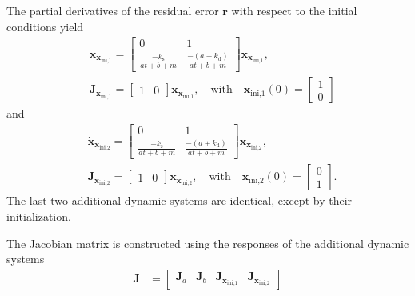 The partial derivatives of the residual error $\mathbf{r}$ with respect to the initial conditions yield 
\begin{equation} \begin{aligned}
    & \dot{\mathbf{x}}_{\mathbf{x}_{\text{ini,1}}} = \begin{bmatrix} 0 & 1 \\ \frac{-k_{\mathrm{s}}}{a t + b + m} & \frac{-(a + k_{\mathrm{d}})}{a t + b + m} \end{bmatrix} \mathbf{x}_{\mathbf{x}_{\text{ini,1}}}  , \\
    & \mathbf{J}_{\mathbf{x}_{\text{ini,1}}} = \begin{bmatrix} 1 & 0 \end{bmatrix} \mathbf{x}_{\mathbf{x}_{\text{ini,1}}}, \quad \mathrm{with} \quad  \mathbf{x}_{\text{ini,1}}(0) = \begin{bmatrix} 1 \\ 0 \end{bmatrix} 
\end{aligned} \end{equation}
and
\begin{equation} \begin{aligned}
    & \dot{\mathbf{x}}_{\mathbf{x}_{\text{ini,2}}} = \begin{bmatrix} 0 & 1 \\ \frac{-k_{\mathrm{s}}}{a t + b + m} & \frac{-(a+k_{\mathrm{d}})}{a t + b + m} \end{bmatrix} \mathbf{x}_{\mathbf{x}_{\text{ini,2}}}  ,  \\
    & \mathbf{J}_{\mathbf{x}_{\text{ini,2}}} = \begin{bmatrix} 1 & 0 \end{bmatrix} \mathbf{x}_{\mathbf{x}_{\text{ini,2}}}, \quad \mathrm{with} \quad  \mathbf{x}_{\text{ini,2}}(0) = \begin{bmatrix} 0 \\ 1 \end{bmatrix} .
\end{aligned} \end{equation}
The last two additional dynamic systems are identical, except by their initialization.  

The Jacobian matrix is constructed using the responses of the additional dynamic systems  
\begin{equation} \begin{aligned} \mathbf{J} &= \begin{bmatrix} \mathbf{J}_a & \mathbf{J}_b & \mathbf{J}_{\mathbf{x}_{\text{ini,1}}} & \mathbf{J}_{\mathbf{x}_{\text{ini,2}}} \end{bmatrix} \end{aligned} \end{equation}


